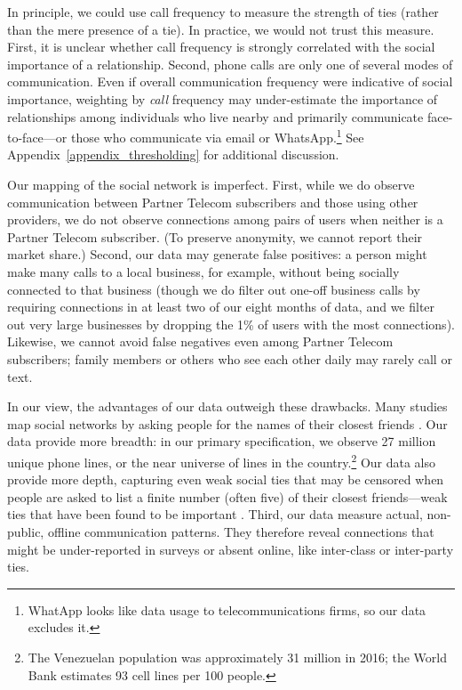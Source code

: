 \documentclass[12pt]{article}
\begin{document}
In principle, we could use call frequency to measure the strength of ties (rather than the mere presence of a tie). In practice, we would not trust this measure. First, it is unclear whether call frequency is strongly correlated with the social importance of a relationship. Second, phone calls are only one of several modes of communication. Even if overall communication frequency were indicative of social importance, weighting by \emph{call} frequency may under-estimate the importance of relationships among individuals who live nearby and primarily communicate face-to-face---or those who communicate via email or WhatsApp.\footnote{WhatApp looks like data usage to telecommunications firms, so our data excludes it.} See Appendix~\ref{appendix_thresholding} for additional discussion.

Our mapping of the social network is imperfect. First, while we do observe communication between Partner Telecom subscribers and those using other providers, we do not observe connections among pairs of users when neither is a Partner Telecom subscriber. (To preserve anonymity, we cannot report their market share.) Second, our data may generate false positives: a person might make many calls to a local business, for example, without being socially connected to that business (though we do filter out one-off business calls by requiring connections in at least two of our eight months of data, and we filter out very large businesses by dropping the 1\% of users with the most connections).
Likewise, we cannot avoid false negatives even among Partner Telecom subscribers; family members or others who see each other daily may rarely call or text.

In our view, the advantages of our data outweigh these drawbacks. Many studies map social networks by asking people for the names of their closest friends  \cite[e.g.][]{Larson:2016uz,Banerjee:2014kl,Rojo:2014vw,Fafchamps:2013tg,Dionne:2014ga}. Our data provide more breadth: in our primary specification, we observe 27 million unique phone lines, or the near universe of lines in the country.\footnote{The Venezuelan population was approximately 31 million in 2016; the World Bank estimates 93 cell lines per 100 people.} Our data also provide more depth, capturing even weak social ties that may be censored when people are asked to list a finite number (often five) of their closest friends---weak ties that have been found to be important \citep{Granovetter:1973bk}. Third, our data measure actual, non-public, offline communication patterns. They therefore reveal connections that might be under-reported in surveys or absent online, like inter-class or inter-party ties.
\end{document}
